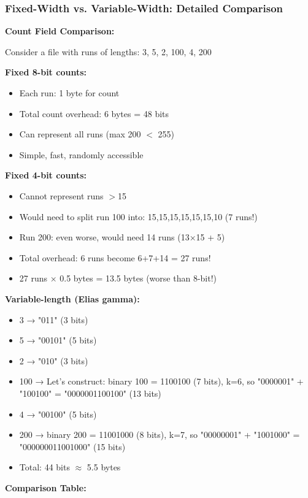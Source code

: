 \newpage
\subsubsection*{Fixed-Width vs. Variable-Width: Detailed Comparison}

\begin{examplebox}
\textbf{Count Field Comparison:}

Consider a file with runs of lengths: 3, 5, 2, 100, 4, 200

\textbf{Fixed 8-bit counts:}
\begin{itemize}
    \item Each run: 1 byte for count
    \item Total count overhead: 6 bytes = 48 bits
    \item Can represent all runs (max 200 $<$ 255)
    \item Simple, fast, randomly accessible
\end{itemize}

\textbf{Fixed 4-bit counts:}
\begin{itemize}
    \item Cannot represent runs $>$15
    \item Would need to split run 100 into: 15,15,15,15,15,15,10 (7 runs!)
    \item Run 200: even worse, would need 14 runs (13×15 + 5)
    \item Total overhead: 6 runs become 6+7+14 = 27 runs!
    \item 27 runs × 0.5 bytes = 13.5 bytes (worse than 8-bit!)
\end{itemize}

\textbf{Variable-length (Elias gamma):}
\begin{itemize}
    \item 3 → "011" (3 bits)
    \item 5 → "00101" (5 bits)
    \item 2 → "010" (3 bits)
    \item 100 → Let's construct: binary 100 = 1100100 (7 bits), k=6, so "0000001" + "100100" = "0000001100100" (13 bits)
    \item 4 → "00100" (5 bits)
    \item 200 → binary 200 = 11001000 (8 bits), k=7, so "00000001" + "1001000" = "000000011001000" (15 bits)
    \item Total: 44 bits $\approx$ 5.5 bytes
\end{itemize}

\textbf{Comparison Table:}


\end{examplebox}
